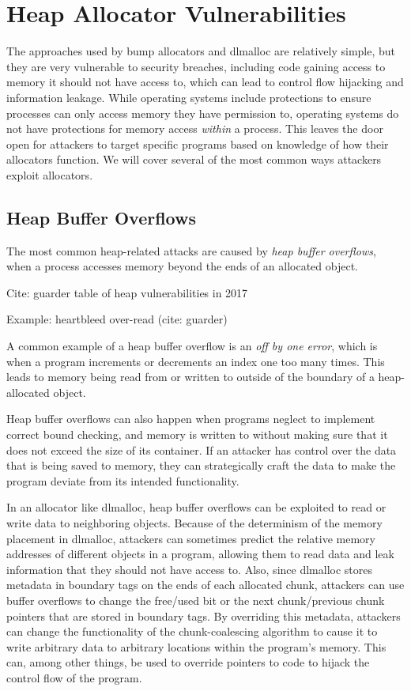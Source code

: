 \documentclass[conference]{IEEEtran}
\begin{document}
\section{Heap Allocator Vulnerabilities}

The approaches used by bump allocators and dlmalloc are relatively simple, but they are very vulnerable to security breaches, including code gaining access to memory it should not have access to, which can lead to control flow hijacking and information leakage.
While operating systems include protections to ensure processes can only access memory they have permission to, operating systems do not have protections for memory access \emph{within} a process.
This leaves the door open for attackers to target specific programs based on knowledge of how their allocators function.
We will cover several of the most common ways attackers exploit allocators.

\subsection{Heap Buffer Overflows}
The most common heap-related attacks are caused by \emph{heap buffer overflows}, when a process accesses memory beyond the ends of an allocated object.

	{\color{red} Cite: guarder table of heap vulnerabilities in 2017 }

	{\color{red} Example: heartbleed over-read (cite: guarder) }

A common example of a heap buffer overflow is an \emph{off by one error}, which is when a program increments or decrements an index one too many times.
This leads to memory being read from or written to outside of the boundary of a heap-allocated object.

Heap buffer overflows can also happen when programs neglect to implement correct bound checking, and memory is written to without making sure that it does not exceed the size of its container.
If an attacker has control over the data that is being saved to memory, they can strategically craft the data to make the program deviate from its intended functionality.

In an allocator like dlmalloc, heap buffer overflows can be exploited to read or write data to neighboring objects.
Because of the determinism of the memory placement in dlmalloc, attackers can sometimes predict the relative memory addresses of different objects in a program, allowing them to read data and leak information that they should not have access to.
Also, since dlmalloc stores metadata in boundary tags on the ends of each allocated chunk, attackers can use buffer overflows to change the free/used bit or the next chunk/previous chunk pointers that are stored in boundary tags.
By overriding this metadata, attackers can change the functionality of the chunk-coalescing algorithm to cause it to write arbitrary data to arbitrary locations within the program's memory.
This can, among other things, be used to override pointers to code to hijack the control flow of the program.
\end{document}
